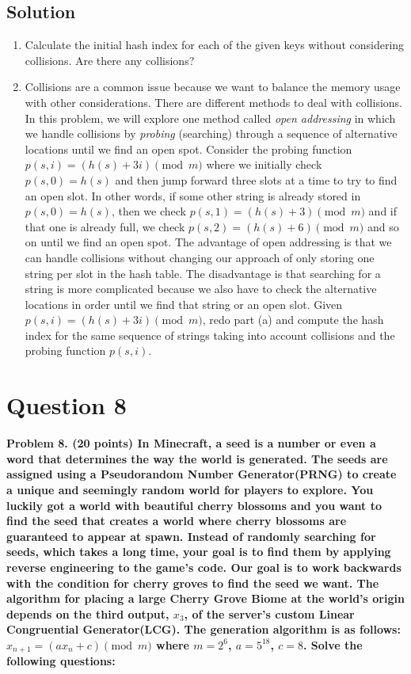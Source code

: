 \documentclass[11pt]{article}
\begin{document}
    \subsection*{Solution}
    \begin{enumerate}[label=(\alph*)]
        \item Calculate the initial hash index for each of the given keys without considering collisions. Are there any collisions?
        \item Collisions are a common issue because we want to balance the memory usage with other considerations. There are different methods to deal with collisions. In this problem, we will explore one method called \textit{open addressing} in which we handle collisions by \textit{probing} (searching) through a sequence of alternative locations until we find an open spot. Consider the probing function $p(s, i) = (h(s) + 3i) \pmod{m}$ where we initially check $p(s, 0) = h(s)$ and then jump forward three slots at a time to try to find an open slot. In other words, if some other string is already stored in $p(s, 0) = h(s)$, then we check $p(s, 1) = (h(s) + 3) \pmod{m}$ and if that one is already full, we check $p(s, 2) = (h(s) + 6) \pmod{m}$ and so on until we find an open spot. The advantage of open addressing is that we can handle collisions without changing our approach of only storing one string per slot in the hash table. The disadvantage is that searching for a string is more complicated because we also have to check the alternative locations in order until we find that string or an open slot. Given $p(s, i) = (h(s) + 3i) \pmod{m}$, redo part (a) and compute the hash index for the same sequence of strings taking into account collisions and the probing function $p(s, i)$.
    \end{enumerate}


\clearpage
\section*{Question 8}

    \textbf{Problem 8. (20 points) In Minecraft, a seed is a number or even a word that determines the way the world is generated. The seeds are assigned using a Pseudorandom Number Generator(PRNG) to create a unique and seemingly random world for players to explore. You luckily got a world with beautiful cherry blossoms and you want to find the seed that creates a world where cherry blossoms are guaranteed to appear at spawn. Instead of randomly searching for seeds, which takes a long time, your goal is to find them by applying reverse engineering to the game’s code. Our goal is to work backwards with the condition for cherry groves to find the seed we want. The algorithm for placing a large Cherry Grove Biome at the world’s origin depends on the third output, $x_3$, of the server’s custom Linear Congruential Generator(LCG). The generation algorithm is as follows:
    \( x_{n+1} = (ax_n + c) \pmod{m} \)
    where $m = 2^6$, $a = 5^{18}$, $c = 8$. Solve the following questions:}
\end{document}
